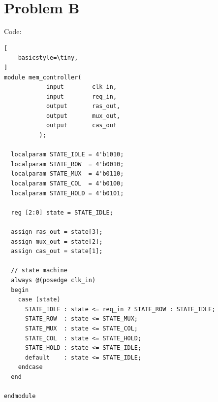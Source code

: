 \documentclass[12pt]{article}
\begin{document}
\section{Problem B}
Code:
\begin{lstlisting}[
    basicstyle=\tiny,
]
module mem_controller(
            input        clk_in,
            input        req_in,
            output       ras_out,
            output       mux_out,
            output       cas_out
          );

  localparam STATE_IDLE = 4'b1010;
  localparam STATE_ROW  = 4'b0010;
  localparam STATE_MUX  = 4'b0110;
  localparam STATE_COL  = 4'b0100;
  localparam STATE_HOLD = 4'b0101;

  reg [2:0] state = STATE_IDLE;

  assign ras_out = state[3];
  assign mux_out = state[2];
  assign cas_out = state[1];

  // state machine
  always @(posedge clk_in)
  begin
    case (state)
      STATE_IDLE : state <= req_in ? STATE_ROW : STATE_IDLE;
      STATE_ROW  : state <= STATE_MUX;
      STATE_MUX  : state <= STATE_COL;
      STATE_COL  : state <= STATE_HOLD;
      STATE_HOLD : state <= STATE_IDLE;
      default    : state <= STATE_IDLE;
    endcase
  end

endmodule
\end{lstlisting}
\end{document}
